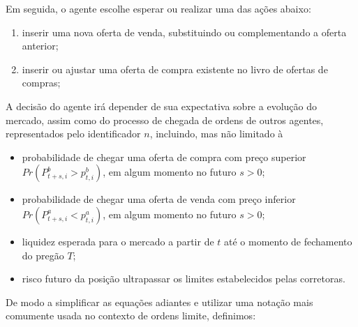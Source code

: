 Em seguida, o agente escolhe esperar ou realizar uma das ações abaixo:
\begin{enumerate}
    \item inserir uma nova oferta de venda, substituindo ou complementando a oferta anterior;
    \item inserir ou ajustar uma oferta de compra existente no livro de ofertas de compras;
\end{enumerate}

A decisão do agente irá depender de sua expectativa sobre a evolução do mercado, assim como do processo de chegada de ordens de outros agentes, representados pelo identificador $n$, incluindo, mas não limitado à
\begin{itemize}
    \item probabilidade de chegar uma oferta de compra com preço superior $Pr(P_{t + s, i}^{b} > p_{t, i}^{b})$, em algum momento no futuro $s > 0$;
    \item probabilidade de chegar uma oferta de venda com preço inferior $Pr(P_{t + s, i}^{a} < p_{t, i}^{a})$, em algum momento no futuro $s > 0$;
    \item liquidez esperada para o mercado a partir de $t$ até o momento de fechamento do pregão $T$;
    \item risco futuro da posição ultrapassar os limites estabelecidos pelas corretoras.
\end{itemize}

De modo a simplificar as equações adiantes e utilizar uma notação mais comumente usada no contexto de ordens limite, definimos:

